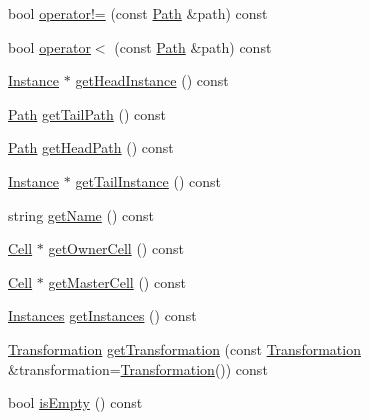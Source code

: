 \begin{DoxyCompactItemize}
\item 
bool \mbox{\hyperlink{classHurricane_1_1Path_a182e82a2bc3f41262e1e76fcdc5a0c1e}{operator!=}} (const \mbox{\hyperlink{classHurricane_1_1Path}{Path}} \&path) const
\item 
bool \mbox{\hyperlink{classHurricane_1_1Path_a5bf33d2d9e3e7d46db770e26c09be90b}{operator$<$}} (const \mbox{\hyperlink{classHurricane_1_1Path}{Path}} \&path) const
\item 
\mbox{\hyperlink{classHurricane_1_1Instance}{Instance}} $\ast$ \mbox{\hyperlink{classHurricane_1_1Path_afddde635f302cee0a215ca364e9689b5}{get\+Head\+Instance}} () const
\item 
\mbox{\hyperlink{classHurricane_1_1Path}{Path}} \mbox{\hyperlink{classHurricane_1_1Path_af0b27566643cc252d9a0feb1709d3180}{get\+Tail\+Path}} () const
\item 
\mbox{\hyperlink{classHurricane_1_1Path}{Path}} \mbox{\hyperlink{classHurricane_1_1Path_ae89034b297b27545cf3865e0cfa31f3d}{get\+Head\+Path}} () const
\item 
\mbox{\hyperlink{classHurricane_1_1Instance}{Instance}} $\ast$ \mbox{\hyperlink{classHurricane_1_1Path_a1f9350514c4751b54b2f01082a93e3bf}{get\+Tail\+Instance}} () const
\item 
string \mbox{\hyperlink{classHurricane_1_1Path_a97ff25c53f4e7bdacb7cb8a58adf6499}{get\+Name}} () const
\item 
\mbox{\hyperlink{classHurricane_1_1Cell}{Cell}} $\ast$ \mbox{\hyperlink{classHurricane_1_1Path_a0954eb842af9d863ea701aa0b681412e}{get\+Owner\+Cell}} () const
\item 
\mbox{\hyperlink{classHurricane_1_1Cell}{Cell}} $\ast$ \mbox{\hyperlink{classHurricane_1_1Path_a3f4a865f570375ec5b6e5cb487369696}{get\+Master\+Cell}} () const
\item 
\mbox{\hyperlink{namespaceHurricane_ac9436b03a2926f34ad6863deae2baadc}{Instances}} \mbox{\hyperlink{classHurricane_1_1Path_af820422a686ab35d611a6c1969e37e90}{get\+Instances}} () const
\item 
\mbox{\hyperlink{classHurricane_1_1Transformation}{Transformation}} \mbox{\hyperlink{classHurricane_1_1Path_af48dc47810f65e7aba6ee8f24ed8a09e}{get\+Transformation}} (const \mbox{\hyperlink{classHurricane_1_1Transformation}{Transformation}} \&transformation=\mbox{\hyperlink{classHurricane_1_1Transformation}{Transformation}}()) const
\item 
bool \mbox{\hyperlink{classHurricane_1_1Path_aeddd764b4b10c72630ee81119614935a}{is\+Empty}} () const
\end{DoxyCompactItemize}
